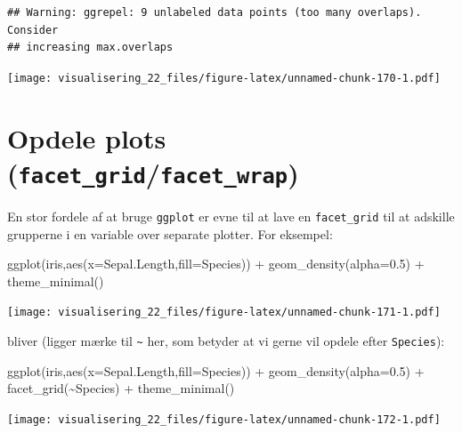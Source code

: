 \documentclass[
]{book}
\newenvironment{Shaded}{\begin{snugshade}}{\end{snugshade}}
\newcommand{\AttributeTok}[1]{\textcolor[rgb]{0.77,0.63,0.00}{#1}}
\newcommand{\FloatTok}[1]{\textcolor[rgb]{0.00,0.00,0.81}{#1}}
\newcommand{\FunctionTok}[1]{\textcolor[rgb]{0.00,0.00,0.00}{#1}}
\newcommand{\NormalTok}[1]{#1}
\newcommand{\SpecialCharTok}[1]{\textcolor[rgb]{0.00,0.00,0.00}{#1}}
\begin{document}
\begin{verbatim}
## Warning: ggrepel: 9 unlabeled data points (too many overlaps). Consider
## increasing max.overlaps
\end{verbatim}

\texttt{[image: visualisering\_22\_files/figure-latex/unnamed-chunk-170-1.pdf]}

\hypertarget{opdele-plots-facet_gridfacet_wrap}{%
\section{\texorpdfstring{Opdele plots (\texttt{facet\_grid}/\texttt{facet\_wrap})}{Opdele plots (facet\_grid/facet\_wrap)}}\label{opdele-plots-facet_gridfacet_wrap}}

En stor fordele af at bruge \texttt{ggplot} er evne til at lave en \texttt{facet\_grid} til at adskille grupperne i en variable over separate plotter. For eksempel:

\begin{Shaded}
\begin{Highlighting}[]
\FunctionTok{ggplot}\NormalTok{(iris,}\FunctionTok{aes}\NormalTok{(}\AttributeTok{x=}\NormalTok{Sepal.Length,}\AttributeTok{fill=}\NormalTok{Species)) }\SpecialCharTok{+} 
  \FunctionTok{geom\_density}\NormalTok{(}\AttributeTok{alpha=}\FloatTok{0.5}\NormalTok{) }\SpecialCharTok{+} 
  \FunctionTok{theme\_minimal}\NormalTok{()}
\end{Highlighting}
\end{Shaded}

\texttt{[image: visualisering\_22\_files/figure-latex/unnamed-chunk-171-1.pdf]}

bliver (ligger mærke til \texttt{\textasciitilde{}} her, som betyder at vi gerne vil opdele efter \texttt{Species}):

\begin{Shaded}
\begin{Highlighting}[]
\FunctionTok{ggplot}\NormalTok{(iris,}\FunctionTok{aes}\NormalTok{(}\AttributeTok{x=}\NormalTok{Sepal.Length,}\AttributeTok{fill=}\NormalTok{Species)) }\SpecialCharTok{+} 
  \FunctionTok{geom\_density}\NormalTok{(}\AttributeTok{alpha=}\FloatTok{0.5}\NormalTok{) }\SpecialCharTok{+} 
  \FunctionTok{facet\_grid}\NormalTok{(}\SpecialCharTok{\textasciitilde{}}\NormalTok{Species) }\SpecialCharTok{+} 
  \FunctionTok{theme\_minimal}\NormalTok{()}
\end{Highlighting}
\end{Shaded}

\texttt{[image: visualisering\_22\_files/figure-latex/unnamed-chunk-172-1.pdf]}
\end{document}
